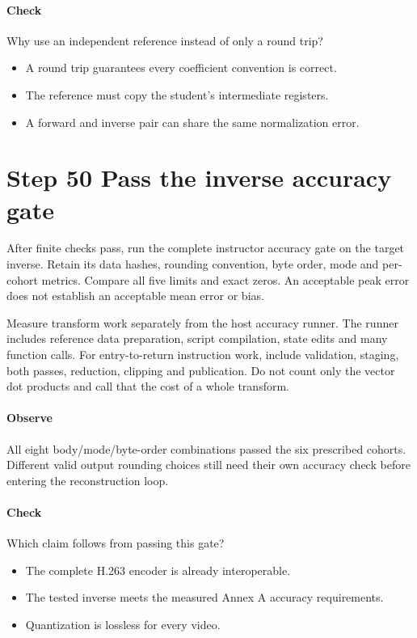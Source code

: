 \paragraph{Check} Why use an independent reference instead of only a round trip?
\begin{itemize}
  \item[A.] A round trip guarantees every coefficient convention is correct.
  \item[B.] The reference must copy the student's intermediate registers.
  \item[C.] A forward and inverse pair can share the same normalization error.
\end{itemize}

\section{Step 50 Pass the inverse accuracy gate}\label{h263-transform-s10}
After finite checks pass, run the complete instructor accuracy gate on the target
inverse. Retain its data hashes, rounding convention, byte order, mode and per-cohort
metrics. Compare all five limits and exact zeros. An acceptable peak error does
not establish an acceptable mean error or bias.

Measure transform work separately from the host accuracy runner. The runner
includes reference data preparation, script compilation, state edits and many
function calls. For entry-to-return instruction work, include validation, staging,
both passes, reduction, clipping and publication. Do not count only the vector
dot products and call that the cost of a whole transform.

\paragraph{Observe} All eight body/mode/byte-order combinations passed the six
prescribed cohorts. Different valid output rounding choices still need their own
accuracy check before entering the reconstruction loop.
\paragraph{Check} Which claim follows from passing this gate?
\begin{itemize}
  \item[A.] The complete H.263 encoder is already interoperable.
  \item[B.] The tested inverse meets the measured Annex A accuracy requirements.
  \item[C.] Quantization is lossless for every video.
\end{itemize}
